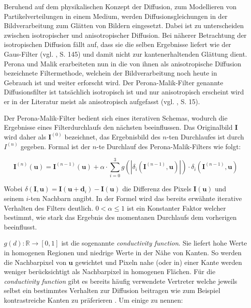 \documentclass[conference]{IEEEtran}
\begin{document}
Beruhend auf dem physikalischen Konzept der Diffusion, zum Modellieren von Partikelverteilungen in einem Medium, werden Diffusionsgleichungen in der Bildverarbeitung zum Glätten von Bildern eingesetzt. Dabei ist zu unterscheiden zwischen isotropischer und anisotropischer Diffusion. Bei näherer Betrachtung der isotropischen Diffusion fällt auf, dass sie die selben Ergebnisse liefert wie der Gaus-Filter (vgl. \cite{burger2009principles}, S. 145) und damit nicht zur kantenerhaltenden Glättung dient. Perona und Malik erarbeiteten nun in \cite{perona1990scale} die von ihnen als anisotropische Diffusion bezeichnete Filtermethode, welchein der Bildverarbeitung noch heute in Gebrauch ist und weiter erforscht wird.
Der Perona-Malik-Filter genannte Diffusionsfilter ist tatsächlich isotropisch ist und nur anisotropisch erscheint wird er in der Literatur meist als anisotropisch aufgefasst (vgl. \cite{weickert1998anisotropic}, S. 15).

Der Perona-Malik-Filter bedient sich eines iterativen Schemas, wodurch die Ergebnisse eines Filterdurchlaufs den nächsten beeinflussen. Das Originalbild $\bm I$ wird daher als $\bm I^{(0)}$ bezeichnet, das Ergebnisbild des $n$-ten Durchlaufes ist durch $I^{(n)}$ gegeben. Formal ist der $n$-te Durchlauf des Perona-Malik-Filters wie folgt:

\begin{equation}
\bm I^{(n)}(\bm u) = 
	\bm I^{(n-1)}(\bm u) + \alpha 
	\cdot \sum_{i=0}^3 g(|\delta_i (\bm I^{(n-1)}, \bm u)|) 
	\cdot \delta_i (\bm I^{(n-1)}, \bm u)
\end{equation}

Wobei $\delta (\bm I, \bm u) = \bm I(\bm u + \bm d_i) - \bm I(\bm u)$ die Differenz des Pixels $\bm I(\bm u)$ und seinem $i$-ten Nachbarn angibt.
In der Formel wird das bereits erwähnte iterative Verhalten des Filters deutlich. $0 < \alpha \leq 1$ ist ein Konstanter Faktor welcher bestimmt, wie stark das Ergebnis des momentanen Durchlaufs dem vorherigen beeinflusst.

$g(d): \mathbb R \rightarrow [0,1]$ ist die sogenannte \textit{conductivity function}. Sie liefert hohe Werte in homogenen Regionen und niedrige Werte in der Nähe von Kanten. So werden die Nachbarpixel von $\bm u$ gewichtet und Pixeln nahe (oder in) einer Kante werden weniger berücksichtigt als Nachbarpixel in homogenen Flächen.
Für die \textit{conductivity function} gibt es bereits häufig verwendete Vertreter welche jeweils selbst ein bestimmtes Verhalten zur Diffusion beitragen wie zum Beispiel kontrastreiche Kanten zu präferieren \cite{burger2009principles}. Um einige zu nennen:
\end{document}
